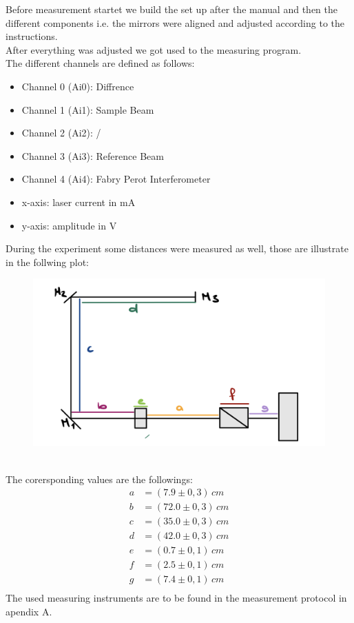 Before measurement startet we build the set up after the manual and
then the different components i.e. the mirrors were aligned and adjusted according 
to the instructions.\\
After everything was adjusted we got used to the measuring program.\\
The different channels are defined as follows:\\
\begin{itemize}
    \item Channel 0 (Ai0): Diffrence
    \item Channel 1 (Ai1): Sample Beam
    \item Channel 2 (Ai2): /
    \item Channel 3 (Ai3): Reference Beam
    \item Channel 4 (Ai4): Fabry Perot Interferometer
    \item x-axis: laser current in mA
    \item y-axis: amplitude in V
\end{itemize}
During the experiment some distances were measured as well, those 
are illustrate in the follwing plot:\\
\begin{figure}[h]
    \centering
    \includegraphics[scale=0.2]{Bilder/Versuch/langen.jpg}
   \end{figure}\\
The corersponding values are the followings:\
\begin{align}
    a &= (7.9 \pm 0,3)\,cm\\
    b &= (72.0 \pm 0,3)\,cm\\
    c &= (35.0 \pm 0,3)\,cm\\
    d &= (42.0 \pm 0,3)\,cm\\
    e &= (0.7 \pm 0,1)\,cm\\
    f &= (2.5 \pm 0,1)\,cm\\
    g &= (7.4 \pm 0,1)\,cm\\
\end{align}
The used measuring instruments 
are to be found in the measurement protocol in apendix A.



